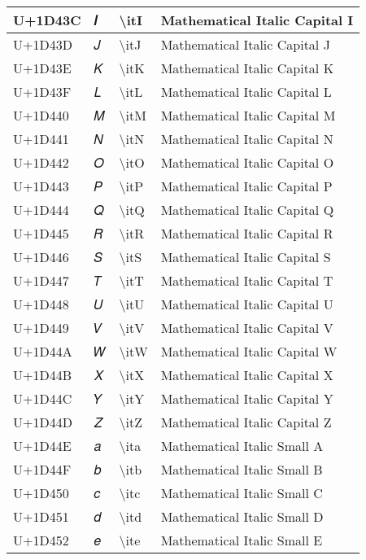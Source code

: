 \begin{table}[h]
\begin{tabulary}{\linewidth}{|L|L|L|L|}
\hline
U+1D43C & 𝐼 & {\textbackslash}itI & Mathematical Italic Capital I \\
\hline
U+1D43D & 𝐽 & {\textbackslash}itJ & Mathematical Italic Capital J \\
\hline
U+1D43E & 𝐾 & {\textbackslash}itK & Mathematical Italic Capital K \\
\hline
U+1D43F & 𝐿 & {\textbackslash}itL & Mathematical Italic Capital L \\
\hline
U+1D440 & 𝑀 & {\textbackslash}itM & Mathematical Italic Capital M \\
\hline
U+1D441 & 𝑁 & {\textbackslash}itN & Mathematical Italic Capital N \\
\hline
U+1D442 & 𝑂 & {\textbackslash}itO & Mathematical Italic Capital O \\
\hline
U+1D443 & 𝑃 & {\textbackslash}itP & Mathematical Italic Capital P \\
\hline
U+1D444 & 𝑄 & {\textbackslash}itQ & Mathematical Italic Capital Q \\
\hline
U+1D445 & 𝑅 & {\textbackslash}itR & Mathematical Italic Capital R \\
\hline
U+1D446 & 𝑆 & {\textbackslash}itS & Mathematical Italic Capital S \\
\hline
U+1D447 & 𝑇 & {\textbackslash}itT & Mathematical Italic Capital T \\
\hline
U+1D448 & 𝑈 & {\textbackslash}itU & Mathematical Italic Capital U \\
\hline
U+1D449 & 𝑉 & {\textbackslash}itV & Mathematical Italic Capital V \\
\hline
U+1D44A & 𝑊 & {\textbackslash}itW & Mathematical Italic Capital W \\
\hline
U+1D44B & 𝑋 & {\textbackslash}itX & Mathematical Italic Capital X \\
\hline
U+1D44C & 𝑌 & {\textbackslash}itY & Mathematical Italic Capital Y \\
\hline
U+1D44D & 𝑍 & {\textbackslash}itZ & Mathematical Italic Capital Z \\
\hline
U+1D44E & 𝑎 & {\textbackslash}ita & Mathematical Italic Small A \\
\hline
U+1D44F & 𝑏 & {\textbackslash}itb & Mathematical Italic Small B \\
\hline
U+1D450 & 𝑐 & {\textbackslash}itc & Mathematical Italic Small C \\
\hline
U+1D451 & 𝑑 & {\textbackslash}itd & Mathematical Italic Small D \\
\hline
U+1D452 & 𝑒 & {\textbackslash}ite & Mathematical Italic Small E \\

\end{tabulary}
\end{table}
